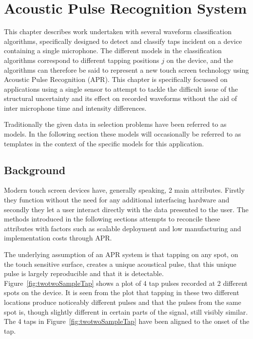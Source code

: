 \chapter{Acoustic Pulse Recognition System}\label{ch:APR}

\ifpdf
    \graphicspath{{Chapter3_APR/Chapter3Figs/PNG/}{Chapter3_APR/Chapter3Figs/PDF/}{Chapter3_APR/Chapter3Figs/}{Chapter3_APR/Chapter3Figs/PDF/}{Chapter3_APR/Chapter3Figs/Kamplitude/}}
\else
    \graphicspath{{Chapter3_APR/Chapter3Figs/EPS/}{Chapter3_APR/Chapter3Figs/}}
\fi

This chapter describes work undertaken with several waveform classification algorithms, specifically designed to detect and classify taps incident on a device containing a single microphone. The different models in the classification algorithms correspond to different tapping positions $j$ on the device, and the algorithms can therefore be said to represent a new touch screen technology using Acoustic Pulse Recognition (APR). This chapter is specifically focussed on applications using a single sensor to attempt to tackle the difficult issue of the structural uncertainty and its effect on recorded waveforms without the aid of inter microphone time and intensity differences.

Traditionally the given data in selection problems have been referred to as models. In the following section these models will occasionally be referred to as templates in the context of the specific models for this application.

\section{Background}
Modern touch screen devices have, generally speaking, 2 main attributes. Firstly they function without the need for any additional interfacing hardware and secondly they let a user interact directly with the data presented to the user. The methods introduced in the following sections attempts to reconcile these attributes with factors such as scalable deployment and low manufacturing and implementation costs through APR.

The underlying assumption of an APR system is that tapping on any spot, on the touch sensitive surface, creates a unique acoustical pulse, that this unique pulse is largely reproducible and that it is detectable. Figure~\ref{fig:twotwoSampleTap} shows a plot of 4 tap pulses recorded at 2 different spots on the device. It is seen from the plot that tapping in these two different locations produce noticeably different pulses and that the pulses from the same spot is, though slightly different in certain parts of the signal, still visibly similar. The 4 taps in Figure~\ref{fig:twotwoSampleTap} have been aligned to the onset of the tap.

